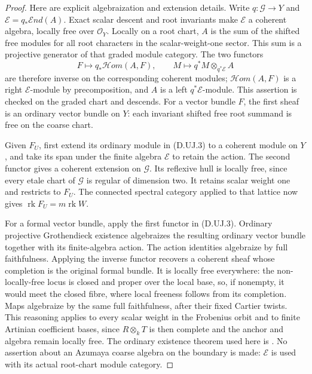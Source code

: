 \begin{proof}
Here are explicit algebraization and extension details.
Write $q:\mathcal G\to Y$ and
$\mathcal E=q_*\mathcal End(A)$. Exact scalar descent and
root invariants make $\mathcal E$ a coherent algebra,
locally free over $\mathcal O_Y$. Locally on a root chart,
$A$ is the sum of the shifted free modules for all root
characters in the scalar-weight-one sector. This sum is a
projective generator of that graded module category.
The two functors
\[
 F\longmapsto q_*\mathcal Hom(A,F),\qquad
 M\longmapsto q^*M\otimes_{q^*\mathcal E}A              \tag{D.UJ.3}
\]
are therefore inverse on the corresponding coherent modules;
$\mathcal Hom(A,F)$ is a right $\mathcal E$-module by
precomposition, and $A$ is a left $q^*\mathcal E$-module.
This assertion is checked on the graded chart and descends.
For a vector bundle $F$, the first sheaf is an ordinary
vector bundle on $Y$: each invariant shifted free root
summand is free on the coarse chart.

Given $F_U$, first extend its ordinary module in (D.UJ.3)
to a coherent module on $Y$, and take its span under the
finite algebra $\mathcal E$ to retain the action. The
second functor gives a coherent extension on $\mathcal G$.
Its reflexive hull is locally free, since every etale chart
of $\mathcal G$ is regular of dimension two. It retains
scalar weight one and restricts to $F_U$.
The connected spectral category applied to that lattice
now gives $\operatorname{rk}F_U=m\operatorname{rk}W$.

For a formal vector bundle, apply the first functor in
(D.UJ.3). Ordinary projective Grothendieck existence
algebraizes the resulting ordinary vector bundle together
with its finite-algebra action. The action identities
algebraize by full faithfulness. Applying the inverse
functor recovers a coherent sheaf whose completion is the
original formal bundle. It is locally free everywhere:
the non-locally-free locus is closed and proper over the
local base, so, if nonempty, it would meet the closed fibre,
where local freeness follows from its completion. Maps
algebraize by the same full faithfulness, after their fixed
Cartier twists. This reasoning applies to every scalar
weight in the Frobenius orbit and to finite Artinian
coefficient bases, since $R\otimes_k T$ is then complete
and the anchor and algebra remain locally free. The
ordinary existence theorem used here is
\citep[Theorem~30.27.1, Tag~088E]{StacksTwistedDepthD}.
No assertion about an Azumaya coarse algebra on the boundary
is made: $\mathcal E$ is used with its actual root-chart
module category.


\end{proof}
